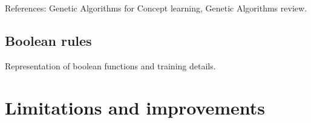 References:
Genetic Algorithms for Concept learning\cite{bib:ga-for-concepts},
Genetic Algorithms review\cite{bib:ga-mutations-review}.

\subsection{Boolean rules}

Representation of boolean functions and training details.

\section{Limitations and improvements}

\label{sec:fluents-limitations}


